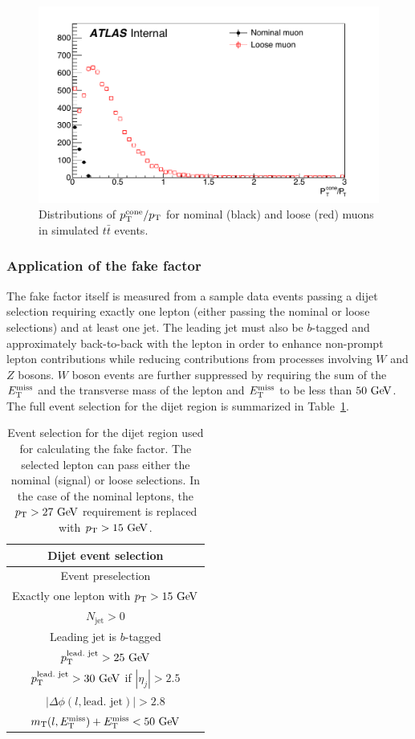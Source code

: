 \begin{figure}[htbp]
  \centering
  \includegraphics[width=.6\textwidth]{figs/ssww_13tev/backgrounds/ff/ptcone_muon_ttbar}
  \caption{Distributions of $p_{\mathrm{T}}^{\textrm{cone}}/p_{\mathrm{T}}$ for nominal (black) and loose (red) muons in simulated $t\bar{t}$ events.}
  \label{fig:ssww13tev_ff_ptcone_muons}
\end{figure}

%
\subsubsection{Application of the fake factor}\label{ssww13tev:ff_implementation}
The fake factor itself is measured from a sample data events passing a dijet selection requiring exactly one lepton (either passing the nominal or loose selections) and at least one jet.
The leading jet must also be $b$-tagged and approximately back-to-back with the lepton in order to enhance non-prompt lepton contributions while reducing contributions from processes involving $W$ and $Z$ bosons.
$W$ boson events are further suppressed by requiring the sum of the $E_{\mathrm{T}}^{\mathrm{miss}}$ and the transverse mass of the lepton and $E_{\mathrm{T}}^{\mathrm{miss}}$ to be less than $50\gev$.
The full event selection for the dijet region is summarized in Table~\ref{tab:ssww13tev_dijet_cr}.

\begin{table}[hbtp]
  \centering
  \begin{tabular}{c}
    Dijet event selection \\
    \hline\hline
    Event preselection\\
    Exactly one lepton with $\pt > 15\gev$\\
    $N_{\textrm{jet}} > 0$ \\
    Leading jet is $b$-tagged \\
    $\pt^{\textrm{lead.\ jet}} > 25\gev$\\
    $\pt^{\textrm{lead.\ jet}} > 30\gev$ if $|\eta_j| > 2.5$ \\
    $|\Delta\phi(l,\textrm{lead.\ jet})| > 2.8$ \\
    $m_{\textrm{T}}(l,\met) + \met < 50\gev$ \\
    \hline
  \end{tabular}
  \caption{Event selection for the dijet region used for calculating the fake factor. The selected lepton can pass either the nominal (signal) or loose selections.  In the case of the nominal leptons, the $\pt > 27\gev$ requirement is replaced with $\pt > 15\gev$.}
  \label{tab:ssww13tev_dijet_cr}
\end{table}

